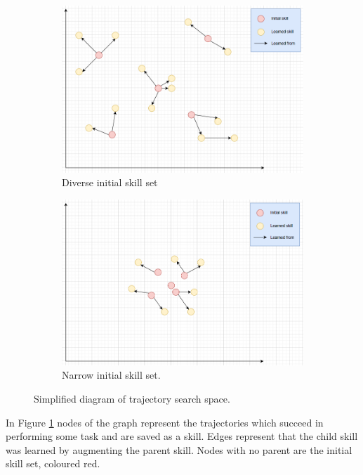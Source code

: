 \begin{figure}[ht]
    \centering
    \begin{subfigure}[b]{0.45\textwidth}
        \includegraphics[width=\textwidth]{figures/graph_spread.PNG}
        \caption{Diverse initial skill set}
    \end{subfigure}
    \hfill
    \begin{subfigure}[b]{0.45\textwidth}
        \includegraphics[width=\textwidth]{figures/graph_narrow.PNG}
        \caption{Narrow initial skill set.}
    \end{subfigure}
    \caption{Simplified diagram of trajectory search space.}
    \label{fig:trajectory-space}
\end{figure}

In Figure \ref{fig:trajectory-space} nodes of the graph represent the trajectories which succeed in performing some task and are saved as a skill. Edges represent that the child skill was learned by augmenting the parent skill. Nodes with no parent are the initial skill set, coloured red.